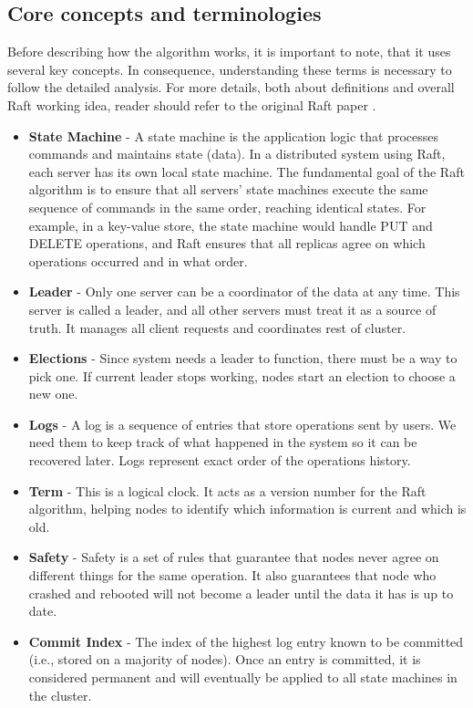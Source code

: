 \documentclass[shortabstract]{iithesis}
\begin{document}
\subsection{Core concepts and terminologies}
Before describing how the algorithm works, it is important to note, that it uses several key concepts. In consequence, understanding these terms is necessary to follow the detailed analysis. For more details, both about definitions and overall Raft working idea, reader should refer to the original Raft paper \cite{raft}.
\begin{itemize}
    \item \textbf{State Machine} \label{def:statemachine} - A state machine is the application logic that processes commands and maintains state (data). In a distributed system using Raft, each server has its own local state machine. The fundamental goal of the Raft algorithm is to ensure that all servers' state machines execute the same sequence of commands in the same order, reaching identical states. For example, in a key-value store, the state machine would handle PUT and DELETE operations, and Raft ensures that all replicas agree on which operations occurred and in what order.
    \item \textbf{Leader} - Only one server can be a coordinator of the data at any time. This server is called a leader, and all other servers must treat it as a source of truth. It manages all client requests and coordinates rest of cluster.
    \item \textbf{Elections} - Since system needs a leader to function, there must be a way to pick one. If current leader stops working, nodes start an election to choose a new one.
    \item \textbf{Logs} - A log is a sequence of entries that store operations sent by users. We need them to keep track of what happened in the system so it can be recovered later. Logs represent exact order of the operations history.
    \item \textbf{Term} - This is a logical clock. It acts as a version number for the Raft algorithm, helping nodes to identify which information is current and which is old.
    \item \textbf{Safety} - Safety is a set of rules that guarantee that nodes never agree on different things for the same operation. It also guarantees that node who crashed and rebooted will not become a leader until the data it has is up to date.
    \item \textbf{Commit Index} - The index of the highest log entry known to be committed (i.e., stored on a majority of nodes). Once an entry is committed, it is considered permanent and will eventually be applied to all state machines in the cluster.
\end{itemize}
\end{document}
